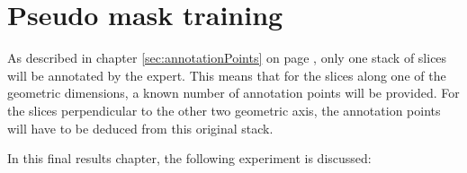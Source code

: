 \chapter{Pseudo mask training}
\par{
    As described in chapter \ref{sec:annotationPoints} on page \pageref{sec:annotationPoints}, only one stack of slices will be annotated by the expert.
    This means that for the slices along one of the geometric dimensions, a known number of annotation points will be provided.
    For the slices perpendicular to the other two geometric axis, the annotation points will have to be deduced from this original stack.
}
\par{
    In this final results chapter, the following experiment is discussed:

}




